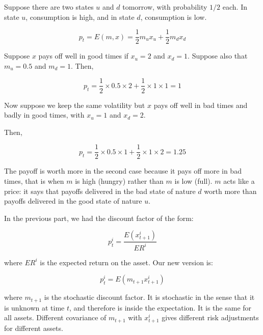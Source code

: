 \begin{tcolorbox}[colback=white, colframe=black, title=Example 1]
Suppose there are two states $u$ and $d$ tomorrow, with probability
$1/2$ each. In state $u$, consumption is high, and in state $d$,
consumption is low.

\begin{equation}
    p_t = E(m, x) = \frac{1}{2} m_u x_u + \frac{1}{2} m_d x_d
\end{equation}


Suppose $x$ pays off well in good times if $x_u = 2$ and 
$x_d = 1$. Suppose also that $m_u = 0.5$ and $m_d = 1$. 
Then,

\begin{equation}
    p_t = \frac{1}{2} \times 0.5 \times 2 + \frac{1}{2} \times 1 \times 1 = 1
\end{equation}

Now suppose we keep the same volatility but $x$ pays off well 
in bad times and badly in good times, with $x_u = 1$ and $x_d = 2$.

Then,

\begin{equation}
    p_t = \frac{1}{2} \times 0.5 \times 1 + \frac{1}{2} \times 1 \times 2 = 1.25
\end{equation}

The payoff is worth more in the second case because it pays off
more in bad times, that is when $m$ is high (hungry) rather 
than $m$ is low (full). 
$m$ acts like a price: it says that payoffs 
delivered in the bad state of nature $d$ worth more than 
payoffs delivered in the good state of nature $u$.

\end{tcolorbox}

In the previous part, we had the discount factor of the form:

\begin{equation}
    p^i_t = \frac{E(x^i_{t+1})}{ER^i}
\end{equation}

where $ER^i$ is the expected return on the asset.
Our new version is:

\begin{equation}
    p^i_t = E(m_{t+1}x^i_{t+1})
\end{equation}

where $m_{t+1}$ is the stochastic discount factor. It is 
stochastic in the sense that it is unknown at time $t$, 
and therefore is inside the expectation. It is the same 
for all assets. Different covariance of 
$m_{t+1}$ with $x^i_{t+1}$ gives different risk adjustments
for different assets.

